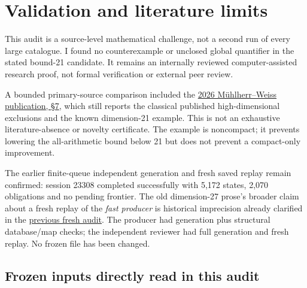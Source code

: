 \documentclass[
  10pt,
]{report}
\begin{document}
\section{Validation and literature
limits}\label{validation-and-literature-limits}

This audit is a source-level mathematical challenge, not a second run of
every large catalogue. I found no counterexample or unclosed global
quantifier in the stated bound-21 candidate. It remains an internally
reviewed computer-assisted research proof, not formal verification or
external peer review.

A bounded primary-source comparison included the
\href{https://londmathsoc.onlinelibrary.wiley.com/doi/pdf/10.1112/jlms.70379}{2026
Mühlherr--Weiss publication, §7}, which still reports the classical
published high-dimensional exclusions and the known dimension-21
example. This is not an exhaustive literature-absence or novelty
certificate. The example is noncompact; it prevents lowering the
all-arithmetic bound below 21 but does not prevent a compact-only
improvement.

The earlier finite-queue independent generation and fresh saved replay
remain confirmed: session 23308 completed successfully with 5,172
states, 2,070 obligations and no pending frontier. The old dimension-27
prose's broader claim about a fresh replay of the \emph{fast producer}
is historical imprecision already clarified in the
\href{fresh_arithmetic_dimension23_scope_audit_20261016.md}{previous
fresh audit}. The producer had generation plus structural database/map
checks; the independent reviewer had full generation and fresh replay.
No frozen file has been changed.

\subsection{Frozen inputs directly read in this
audit}\label{frozen-inputs-directly-read-in-this-audit}
\end{document}
